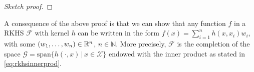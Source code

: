 \begin{proof}[Sketch proof]
%  
\end{proof}

A consequence of the above proof is that we can show that any function $f$ in a RKHS $\mathcal F$ with kernel $h$ can be written in the form $f(x) = \sum_{i=1}^n h(x, x_i)w_i$, with some $(w_1,\dots,w_n)\in\mathbb{R}^n$, $n \in \mathbb N$. 
More precisely, $\mathcal F$ is the completion of the space $\mathcal G = \text{span}\{h(\cdot,x) \, | \, x \in \mathcal X \}$ endowed with the inner product as stated in \eqref{eq:rkhsinnerprod}.



